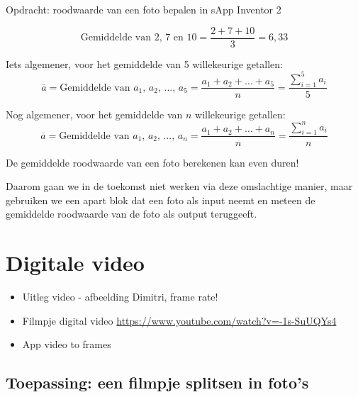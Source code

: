 \begin{opdracht}{Opdracht: roodwaarde van een foto bepalen in sApp Inventor 2}
\begin{enumerate}
	\begin{equation*}
	\text{Gemiddelde van 2, 7 en 10} = \frac{2+7+10}{3} = 6,33
	\end{equation*}

	Iets algemener, voor het gemiddelde van 5 willekeurige getallen:
	\begin{equation*}
	\overline{a} = \text{Gemiddelde van $a_1$, $a_2$, ..., $a_5$} = \frac{a_1+a_2+\ldots+a_5}{n} = \frac{\sum_{i=1}^{5} a_i}{5}
	\end{equation*}
	
	Nog algemener, voor het gemiddelde van $n$ willekeurige getallen:
	\begin{equation*}
	\overline{a} = \text{Gemiddelde van $a_1$, $a_2$, ..., $a_n$} = \frac{a_1+a_2+\ldots+a_n}{n} = \frac{\sum_{i=1}^{n} a_i}{n}
	\end{equation*}
	
	\begin{opmerking}
		De gemiddelde roodwaarde van een foto berekenen kan even duren!
		
		Daarom gaan we in de toekomst niet werken via deze omslachtige manier, maar gebruiken we een apart blok dat een foto als input neemt en meteen de gemiddelde roodwaarde van de foto als output teruggeeft.
	\end{opmerking}
\end{enumerate}
\end{opdracht}

\section{Digitale video}
\label{sec:Mod3_Sec2}
%


\begin{itemize}
	\item Uitleg video - afbeelding Dimitri, frame rate!
	\item Filmpje digital video \url{https://www.youtube.com/watch?v=-1s-SuUQYs4}
	\item App video to frames
\end{itemize}

\subsection{Toepassing: een filmpje splitsen in foto's}

